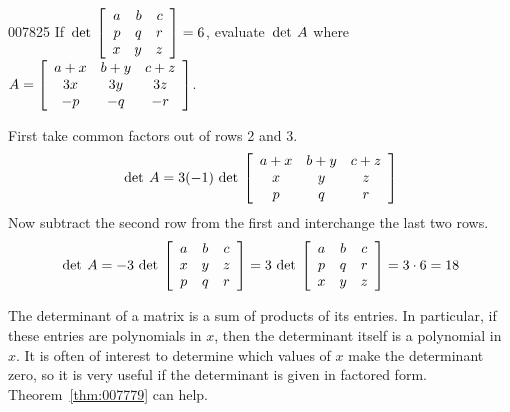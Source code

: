 \begin{example}{}{007825}
If $\thinspace\operatorname{det\medspace} \left[ \begin{array}{rrr}
a & b & c \\
p & q & r \\
x & y & z
\end{array}
\right] = 6$,
 evaluate $\thinspace\operatorname{det \medspace} A$ where $A = \left[ \begin{array}{ccc}
a+x & b+y & c+z \\
3x & 3y & 3z \\
-p & -q & -r
\end{array}\right]$.
 
\begin{solution}
First take common factors out of rows 2 and 3.
\begin{equation*}
\thinspace\operatorname{det \medspace} A = 3(-1) \thinspace\operatorname{det\medspace} \left[ \begin{array}{ccc}
a+x & b+y & c+z \\
x & y & z \\
p & q & r 
\end{array}
\right]
\end{equation*}
Now subtract the second row from the first and interchange the last two rows.
\begin{equation*}
\thinspace\operatorname{det \medspace} A = -3 \thinspace\operatorname{det\medspace} \left[ \begin{array}{ccc}
a & b & c \\
x & y & z \\
p & q & r 
\end{array}
\right]
= 3 \thinspace\operatorname{det\medspace} \left[ \begin{array}{ccc}
a & b & c \\
p & q & r \\
x & y & z 
\end{array}
\right]
 = 3 \cdot 6 = 18
\end{equation*}
\end{solution}
\end{example}

The determinant of a matrix is a sum of products of its entries. In particular, if these entries are polynomials in $x$, then the determinant itself is a polynomial in $x$. It is often of interest to determine which values of $x$ make the determinant zero, so it is very useful if the determinant is given in factored form. Theorem~\ref{thm:007779} can help.

